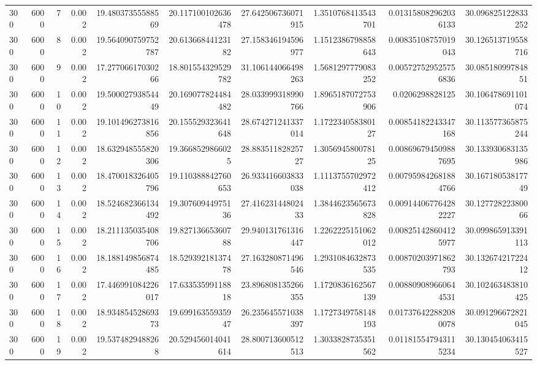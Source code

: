 \begin{tabular}{lrrrrrrrrr}
300 & 6000 & 7 & 0.002 & 19.48037355588569 & 20.117100102636478 & 27.642506736071915 & 1.3510768413543701 & 0.013158082962036133 & 30.096825122833252 \\
300 & 6000 & 8 & 0.002 & 19.564090759752787 & 20.61366844123182 & 27.158346194596977 & 1.1512386798858643 & 0.00835108757019043 & 30.126513719558716 \\
300 & 6000 & 9 & 0.002 & 17.27706617030266 & 18.801554329529782 & 31.106144066498263 & 1.5681297779083252 & 0.005727529525756836 & 30.08518099784851 \\
300 & 6000 & 10 & 0.002 & 19.50002793854449 & 20.169077824484482 & 28.033999318990766 & 1.8965187072753906 & 0.0206298828125 & 30.106478691101074 \\
300 & 6000 & 11 & 0.002 & 19.101496273816856 & 20.155529323641648 & 28.674271241337014 & 1.172234058380127 & 0.00854182243347168 & 30.113577365875244 \\
300 & 6000 & 12 & 0.002 & 18.632948555820306 & 19.3668529866025 & 28.88351182825727 & 1.305694580078125 & 0.008696794509887695 & 30.133930683135986 \\
300 & 6000 & 13 & 0.002 & 18.470018326405796 & 19.110388842760653 & 26.933416603833038 & 1.1113755702972412 & 0.007959842681884766 & 30.16718053817749 \\
300 & 6000 & 14 & 0.002 & 18.524682366134492 & 19.30760944975136 & 27.41623144802433 & 1.3844623565673828 & 0.009144067764282227 & 30.12772822380066 \\
300 & 6000 & 15 & 0.002 & 18.211135035408706 & 19.82713665360788 & 29.940131761316447 & 1.2262225151062012 & 0.008251428604125977 & 30.099865913391113 \\
300 & 6000 & 16 & 0.002 & 18.188149856874485 & 18.52939218137478 & 27.163280871496546 & 1.2931084632873535 & 0.00870203971862793 & 30.13267421722412 \\
300 & 6000 & 17 & 0.002 & 17.446991084226017 & 17.63353599118818 & 23.896808135266355 & 1.1720836162567139 & 0.008809089660644531 & 30.102463483810425 \\
300 & 6000 & 18 & 0.002 & 18.93485452869373 & 19.69916355935947 & 26.235645571038397 & 1.1727349758148193 & 0.017376422882080078 & 30.091296672821045 \\
300 & 6000 & 19 & 0.002 & 19.5374829488268 & 20.529456014041614 & 28.800713600512513 & 1.3033828735351562 & 0.011815547943115234 & 30.130454063415527 \\
\hline
\end{tabular}
